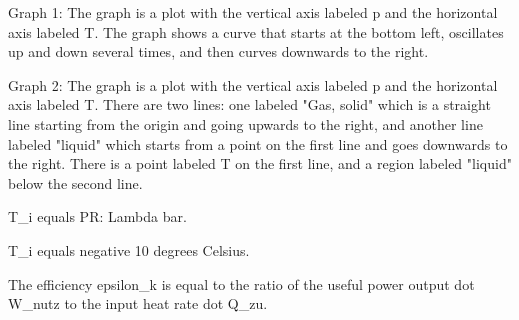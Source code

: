 Graph 1: The graph is a plot with the vertical axis labeled p and the horizontal axis labeled T. The graph shows a curve that starts at the bottom left, oscillates up and down several times, and then curves downwards to the right.

Graph 2: The graph is a plot with the vertical axis labeled p and the horizontal axis labeled T. There are two lines: one labeled "Gas, solid" which is a straight line starting from the origin and going upwards to the right, and another line labeled "liquid" which starts from a point on the first line and goes downwards to the right. There is a point labeled T on the first line, and a region labeled "liquid" below the second line.

T_i equals PR: Lambda bar.

T_i equals negative 10 degrees Celsius.

The efficiency epsilon_k is equal to the ratio of the useful power output dot W_nutz to the input heat rate dot Q_zu.